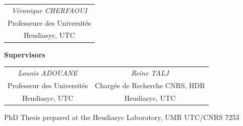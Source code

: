 \begin{titlingpage}
\begin{center}
\begin{tabular}{c }
         \textit{Véronique CHERFAOUI} \\
         Professeure des Universités \\
         Heudiasyc, UTC  
\end{tabular}

        \vspace{0.5cm}


       \textbf{Supervisors}
        \vspace{0.2cm}

\begin{tabular}{c c}
     \textit{Lounis ADOUANE}                           & \textit{Reine TALJ} \\
     Professeur des Universités                        & Chargée de Recherche CNRS, HDR \\
     Heudiasyc, UTC                                    & Heudiasyc, UTC
\end{tabular}


        \vspace{0.2cm}

        \hline



        \vspace{0.5cm}
        {\Large PhD Thesis prepared at the Heudiasyc Laboratory, UMR UTC/CNRS 7253}


\end{center}
\end{titlingpage}
